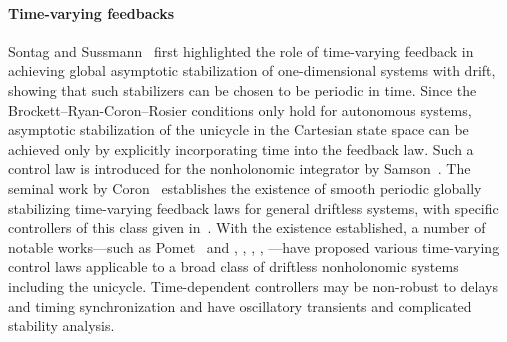 \documentclass[journal,twoside,web]{ieeecolor}
\theoremstyle{definition}
\begin{document}
\paragraph{Time-varying feedbacks}
Sontag and Sussmann~\cite{Sontag1980Remarks} first highlighted the role of time-varying feedback in achieving global asymptotic stabilization of one-dimensional systems with drift, showing that such stabilizers can be chosen to be periodic in time.
Since the Brockett–Ryan-Coron–Rosier conditions only hold for autonomous systems, asymptotic stabilization of the unicycle in the Cartesian state space can be achieved only by explicitly incorporating time into the feedback law. Such a control law is introduced for the nonholonomic integrator by Samson~\cite{samson1990velocity}. The seminal work by Coron~\cite{coron1992global_controllable} establishes the existence of smooth periodic globally stabilizing time-varying feedback laws for general driftless systems, with specific controllers of this class given in~\cite{coron1993smooth}. 
With the existence established, a number of notable works—such as Pomet~\cite{pomet1992explicit} and \cite{samson1993time}, \cite{samson1995control}, \cite{d2019small}, \cite{m2002exponential}, \cite{morin1999design} \cite{zuyev2016exponential}—have proposed various time-varying control laws applicable to a broad class of driftless nonholonomic systems including the unicycle. 
Time-dependent controllers may be %
non-robust to delays and timing synchronization and have oscillatory transients and complicated stability analysis. 


\end{document}
